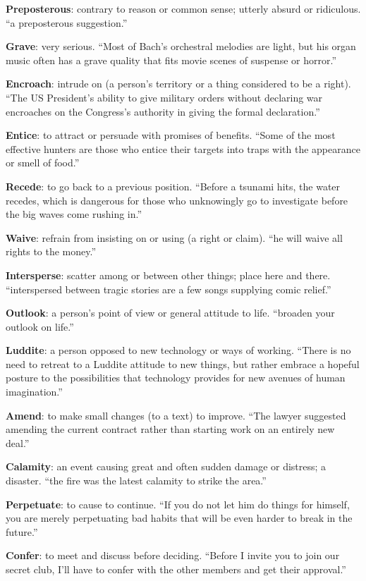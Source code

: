\documentclass[12pt, a4paper]{ximera}
\begin{document}
\textbf{Preposterous}: contrary to reason or common sense; utterly absurd or ridiculous. ``a preposterous suggestion.''

\textbf{Grave}: very serious. ``Most of Bach's orchestral melodies are light, but his organ music often has a grave quality that fits movie scenes of suspense or horror.''

\textbf{Encroach}: intrude on (a person's territory or a thing considered to be a right). ``The US President's ability to give military orders without declaring war encroaches on the Congress's authority in giving the formal declaration.''

\textbf{Entice}: to attract or persuade with promises of benefits. ``Some of the most effective hunters are those who entice their targets into traps with the appearance or smell of food.''

\textbf{Recede}: to go back to a previous position. ``Before a tsunami hits, the water recedes, which is dangerous for those who unknowingly go to investigate before the big waves come rushing in.''

\textbf{Waive}: refrain from insisting on or using (a right or claim). ``he will waive all rights to the money.''

\textbf{Intersperse}: scatter among or between other things; place here and there. ``interspersed between tragic stories are a few songs supplying comic relief.''

\textbf{Outlook}: a person's point of view or general attitude to life. ``broaden your outlook on life.''

\textbf{Luddite}: a person opposed to new technology or ways of working. ``There is no need to retreat to a Luddite attitude to new things, but rather embrace a hopeful posture to the possibilities that technology provides for new avenues of human imagination.''

\textbf{Amend}: to make small changes (to a text) to improve. ``The lawyer suggested amending the current contract rather than starting work on an entirely new deal.''

\textbf{Calamity}: an event causing great and often sudden damage or distress; a disaster. ``the fire was the latest calamity to strike the area.''

\textbf{Perpetuate}: to cause to continue. ``If you do not let him do things for himself, you are merely perpetuating bad habits that will be even harder to break in the future.''

\textbf{Confer}: to meet and discuss before deciding. ``Before I invite you to join our secret club, I'll have to confer with the other members and get their approval.''
\end{document}
